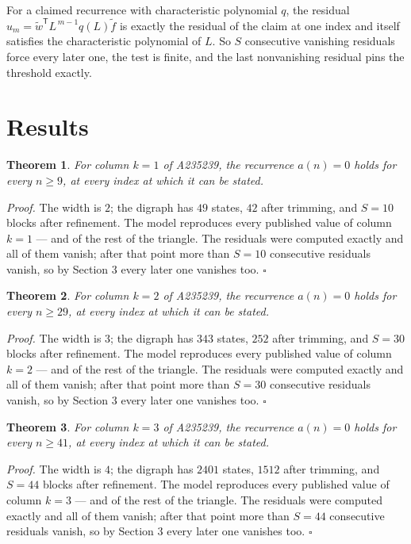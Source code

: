 \documentclass[11pt]{article}
\newtheorem{theorem}{Theorem}
\theoremstyle{definition}
\begin{document}
For a claimed recurrence with characteristic polynomial $q$, the residual $u_m = \tilde w^{\mathsf T}L^{\,m-1}q(L)\tilde f$ is exactly the residual of the claim at one index and itself satisfies the characteristic polynomial of $L$. So $S$ consecutive vanishing residuals force every later one, the test is finite, and the last nonvanishing residual pins the threshold exactly.

\section{Results}

\begin{theorem} For column $k = 1$ of A235239, the recurrence $a(n) = 0$ holds for every $n \ge 9$, at every index at which it can be stated.\end{theorem}

{\itshape Proof.} The width is $2$; the digraph has $49$ states, $42$ after trimming, and $S = 10$ blocks after refinement. The model reproduces every published value of column $k = 1$ --- and of the rest of the triangle. The residuals were computed exactly and all of them vanish; after that point more than $S = 10$ consecutive residuals vanish, so by Section 3 every later one vanishes too. $\square$

\begin{theorem} For column $k = 2$ of A235239, the recurrence $a(n) = 0$ holds for every $n \ge 29$, at every index at which it can be stated.\end{theorem}

{\itshape Proof.} The width is $3$; the digraph has $343$ states, $252$ after trimming, and $S = 30$ blocks after refinement. The model reproduces every published value of column $k = 2$ --- and of the rest of the triangle. The residuals were computed exactly and all of them vanish; after that point more than $S = 30$ consecutive residuals vanish, so by Section 3 every later one vanishes too. $\square$

\begin{theorem} For column $k = 3$ of A235239, the recurrence $a(n) = 0$ holds for every $n \ge 41$, at every index at which it can be stated.\end{theorem}

{\itshape Proof.} The width is $4$; the digraph has $2401$ states, $1512$ after trimming, and $S = 44$ blocks after refinement. The model reproduces every published value of column $k = 3$ --- and of the rest of the triangle. The residuals were computed exactly and all of them vanish; after that point more than $S = 44$ consecutive residuals vanish, so by Section 3 every later one vanishes too. $\square$
\end{document}
